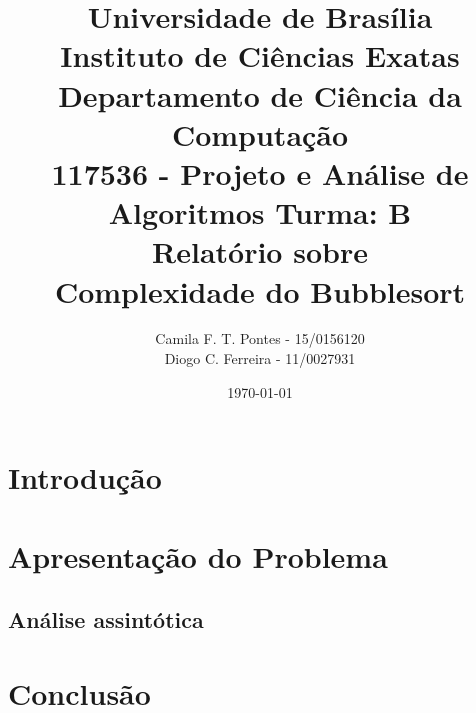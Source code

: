 \documentclass[12pt]{article}
\title{{\large Universidade de Brasília \\ Instituto de Ciências Exatas \\
Departamento de Ciência da Computação} \\[1cm]
117536 - Projeto e Análise de Algoritmos Turma: B\\[.5cm]
Relatório sobre {\\ \bf Complexidade do Bubblesort}}
\author{Camila F. T. Pontes - 15/0156120 \\
        Diogo C. Ferreira - 11/0027931}
\date{\today}
\begin{document}
\maketitle

\section{Introdução}


\section{Apresentação do Problema}

\subsection{Análise assintótica}



\section{Conclusão}




\end{document}
